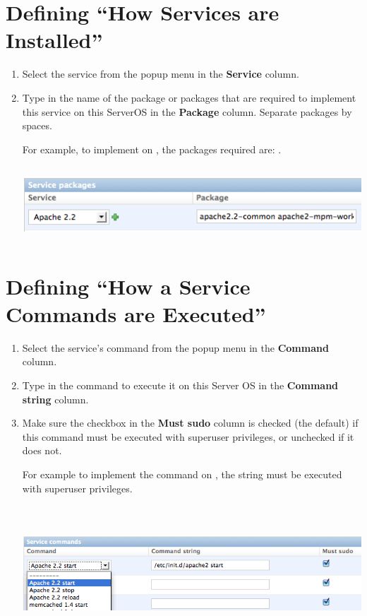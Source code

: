 \documentclass[letterpaper,10pt,english]{manual}
\begin{document}
\section{Defining ``How Services are Installed''}
\begin{enumerate}
\item {} 
Select the service from the popup menu in the \textbf{Service} column.

\item {} 
Type in the name of the package or packages that are required to implement this service on this ServerOS in the \textbf{Package} column. Separate packages by spaces.

For example, to implement  on , the packages required are: .

\includegraphics[width=483pt,height=80pt]{add_service_package.png}

\end{enumerate}
\hypertarget{howaservicecommandsareexecuted}{}

\section{Defining ``How a Service Commands are Executed''}
\begin{enumerate}
\item {} 
Select the service's command from the popup menu in the \textbf{Command} column.

\item {} 
Type in the command to execute it on this Server OS in the \textbf{Command string} column.

\item {} 
Make sure the checkbox in the \textbf{Must sudo} column is checked (the default) if this command must be executed with superuser privileges, or unchecked if it does not.

For example to implement the  command on , the string  must be executed with superuser privileges.

\includegraphics[width=653pt,height=144pt]{add_service_command.png}

\end{enumerate}
\end{document}
